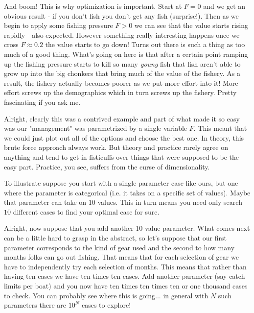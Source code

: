 \documentclass[11pt,a5paper]{book}
\begin{document}
And boom! This is why optimization is important. Start at $F=0$ and we get an obvious result - if you don't fish you don't get any fish (surprise!). Then as we begin to apply some fishing pressure $F>0$ we can see that the value starts rising rapidly - also expected. However something really interesting happens once we cross $F\approx 0.2$ the value starts to go down! Turns out there is such a thing as too much of a good thing. What's going on here is that after a certain point ramping up the fishing pressure starts to kill so many \textit{young} fish that fish aren't able to grow up into the big chonkers that bring much of the value of the fishery. As a result, the fishery actually becomes poorer as we put more effort into it! More effort screws up the demographics which in turn screws up the fishery. Pretty fascinating if you ask me.  
\newline

Alright, clearly this was a contrived example and part of what made it so easy was our "management" was parametrized by a single variable $F$. This meant that we could just plot out all of the options and choose the best one. In theory, this brute force approach always work. But theory and practice rarely agree on anything and tend to get in fisticuffs over things that were supposed to be the easy part. Practice, you see, suffers from the curse of dimensionality. 
\newline

To illustrate suppose you start with a single parameter case like ours, but one where the parameter is categorical (i.e. it takes on a specific set of values). Maybe that parameter can take on 10 values. This in turn means you need only search $10$ different cases to find your optimal case for sure. 
\newline

Alright, now suppose that you add another 10 value parameter. What comes next can be a little hard to grasp in the abstract, so let's suppose that our first parameter corresponds to the kind of gear used and the second to how many months folks can go out fishing. That means that for each selection of gear we have to independently try each selection of months. This means that rather than having ten cases we have ten times ten cases. Add another parameter (say catch limits per boat) and you now have ten times ten times ten or one thousand cases to check. You can probably see where this is going... in general with $N$ such parameters there are $10^N$ cases to explore!
\newline
\end{document}
